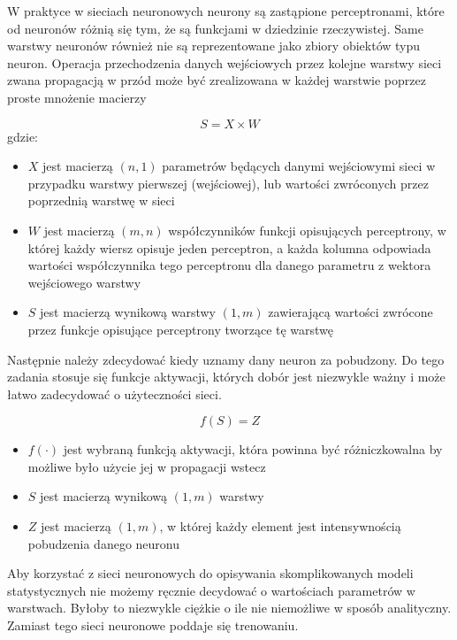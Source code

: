 \documentclass{article}
\begin{document}
W praktyce w sieciach neuronowych neurony są zastąpione perceptronami, które od neuronów 
różnią się tym, że są funkcjami w dziedzinie rzeczywistej.
Same warstwy neuronów również nie są reprezentowane jako zbiory obiektów typu neuron. 
Operacja przechodzenia danych wejściowych przez kolejne warstwy sieci
zwana propagacją w przód może być zrealizowana w każdej warstwie poprzez proste mnożenie macierzy

\begin {equation}
    S = X \times W
\end{equation}
gdzie:
\begin{itemize}
    \item $X$ jest macierzą $(n, 1)$ parametrów będących danymi 
    wejściowymi sieci w przypadku warstwy pierwszej (wejściowej), 
    lub wartości zwróconych przez poprzednią warstwę w sieci
    \item $W$ jest macierzą $(m, n)$ współczynników funkcji opisujących perceptrony, 
    w której każdy wiersz opisuje jeden perceptron, 
    a każda kolumna odpowiada wartości współczynnika tego perceptronu dla danego parametru 
    z wektora wejściowego warstwy
    \item $S$ jest macierzą wynikową warstwy $(1, m)$ zawierającą wartości zwrócone przez 
    funkcje opisujące perceptrony tworzące tę warstwę
\end{itemize}

Następnie należy zdecydować kiedy uznamy dany neuron za pobudzony. Do tego zadania 
stosuje się funkcje aktywacji, których dobór jest niezwykle ważny
i może łatwo zadecydować o użyteczności sieci.

\begin{equation}
    f(S) = Z
\end{equation}

\begin{itemize}
    \item $f(\cdot)$ jest wybraną funkcją aktywacji, która powinna być 
    różniczkowalna by możliwe było użycie jej w propagacji wstecz
    \item $S$ jest macierzą wynikową $(1, m)$ warstwy
    \item $Z$ jest macierzą $(1, m)$, w której każdy element jest intensywnością pobudzenia danego neuronu
\end{itemize}

Aby korzystać z sieci neuronowych do opisywania skomplikowanych modeli 
statystycznych nie możemy ręcznie decydować o wartościach parametrów w warstwach. 
Byłoby to niezwykle ciężkie o ile nie niemożliwe w sposób analityczny. 
Zamiast tego sieci neuronowe poddaje się trenowaniu.
\end{document}
